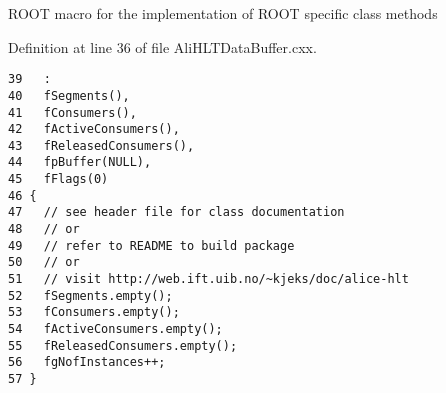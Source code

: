 ROOT macro for the implementation of ROOT specific class methods 

Definition at line 36 of file Ali\-HLTData\-Buffer.cxx.

\footnotesize\begin{verbatim}39   :
40   fSegments(),
41   fConsumers(),
42   fActiveConsumers(),
43   fReleasedConsumers(),
44   fpBuffer(NULL),
45   fFlags(0)
46 {
47   // see header file for class documentation
48   // or
49   // refer to README to build package
50   // or
51   // visit http://web.ift.uib.no/~kjeks/doc/alice-hlt
52   fSegments.empty();
53   fConsumers.empty();
54   fActiveConsumers.empty();
55   fReleasedConsumers.empty();
56   fgNofInstances++;
57 }

\end{verbatim}\normalsize 


